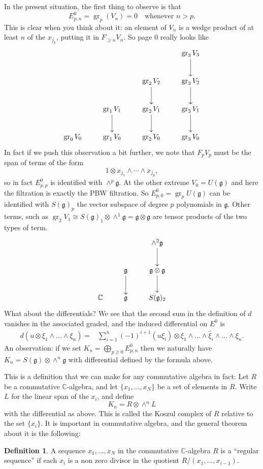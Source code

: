 \documentclass[12pt]{article}
\theoremstyle{plain}
\theoremstyle{definition}
\newtheorem{defn}{Definition}[section]
\numberwithin{equation}{section}
\DeclareMathOperator{\gr}{gr}
\newcommand{\what}[1]{\widehat{#1}}
\newcommand{\C}{\mathbb{C}}
\newcommand{\g}{\mathfrak{g}}
\begin{document}
In the present situation, the first thing to observe is that
\[
E^0_{p, n} = \gr_p(V_n) = 0 \quad \text{whenever $n > p$}.
\]
This is clear when you think about it: an element of $V_n$ is a wedge product of at least $n$ of the $x_{j_k}$, putting it in $F_{\geq n} V_n$. So page $0$ really looks like
\begin{align*}
\xymatrix{
 &  &  & \gr_3V_3 \ar@{->}[d] \\
%
 &  & \gr_2V_2 \ar@{->}[d] & \gr_3V_2 \ar@{->}[d] \\
%
 & \gr_1V_1 \ar@{->}[d] & \gr_2V_1 \ar@{->}[d] & \gr_3V_1 \ar@{->}[d] \\
%
\gr_0V_0  & \gr_1V_0  & \gr_2V_0  & \gr_3V_0  \\
}
\end{align*}
In fact if we push this observation a bit further, we note that $F_pV_p$ must be the span of terms of the form
\[
1 \otimes  x_{j_1} \wedge \cdots \wedge x_{j_p},
\]
so in fact $E^0_{p, p}$ is identified with $\wedge^p \g$. At the other extreme $V_0 = U(\g)$ and here the filtration is exactly the PBW filtration. So $E^0_{p, 0} = \gr_p U(\g)$ can be identified with $S(\g)_p$ the vector subspace of degree $p$ polynomials in $\g$. Other terms, such as $\gr_2 V_1 \cong S(\g)_1 \otimes \wedge^1\g = \g \otimes \g$ are tensor products of the two types of term.
\begin{align*}
\xymatrix{
 &  & \wedge^2 \g \ar@{->}[d] \\
%
 & \g \ar@{->}[d] & \g \otimes \g \ar@{->}[d] \\
%
\C  & \g  & S(\g)_2 \\
}
\end{align*}
What about the differentials? We see that the second sum in the definition of $d$ vanishes in the associated graded, and the induced differential on $E^0$ is
\begin{align*}
d(u \otimes \xi_1 \wedge \ldots \wedge \xi_n) = {} & \sum_{i=1}^{n} (-1)^{i+1} (u \xi_i) \otimes \xi_1 \wedge \ldots \wedge \what\xi_i \wedge \ldots \wedge \xi_n.
\end{align*}
An observation: if we set $K_n = \bigoplus_{p \geq 0} E^0_{p, n}$ then we naturally have $K_n = S(\g) \otimes \wedge^n \g$ with differential defined by the formula above.

This is a definition that we can make for any commutative algebra in fact: Let $R$ be a commutative $\C$-algebra, and let $\{x_1, \ldots, x_N\}$ be a set of elements in $R$. Write $L$ for the linear span of the $x_i$, and define
\[
K_n = R \otimes \wedge^n L
\]
with the differential as above. This is called the Koszul complex of $R$ relative to the set $\{x_i\}$. It is important in commutative algebra, and the general theorem about it is the following:
\begin{defn}
A sequence $x_1, \ldots, x_N$ in the commutative $\C$-algebra $R$ is a ``regular sequence'' if each $x_i$ is a non zero divisor in the quotient $R / (x_1, \ldots, x_{i-1})$.
\end{defn}
\end{document}
